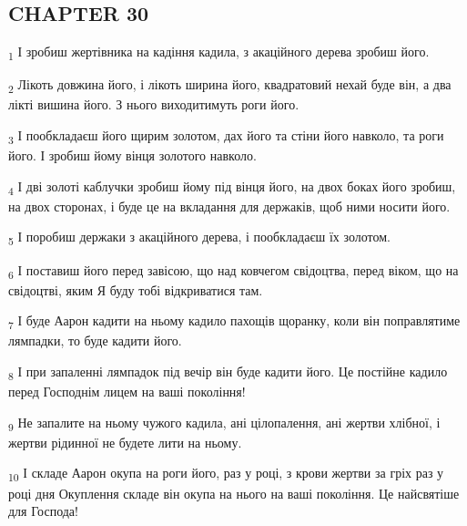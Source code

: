 \subsection{CHAPTER 30}
\begin{tcolorbox}
\textsubscript{1} І зробиш жертівника на кадіння кадила, з акаційного дерева зробиш його.
\end{tcolorbox}
\begin{tcolorbox}
\textsubscript{2} Лікоть довжина його, і лікоть ширина його, квадратовий нехай буде він, а два лікті вишина його. З нього виходитимуть роги його.
\end{tcolorbox}
\begin{tcolorbox}
\textsubscript{3} І пообкладаєш його щирим золотом, дах його та стіни його навколо, та роги його. І зробиш йому вінця золотого навколо.
\end{tcolorbox}
\begin{tcolorbox}
\textsubscript{4} І дві золоті каблучки зробиш йому під вінця його, на двох боках його зробиш, на двох сторонах, і буде це на вкладання для держаків, щоб ними носити його.
\end{tcolorbox}
\begin{tcolorbox}
\textsubscript{5} І поробиш держаки з акаційного дерева, і пообкладаєш їх золотом.
\end{tcolorbox}
\begin{tcolorbox}
\textsubscript{6} І поставиш його перед завісою, що над ковчегом свідоцтва, перед віком, що на свідоцтві, яким Я буду тобі відкриватися там.
\end{tcolorbox}
\begin{tcolorbox}
\textsubscript{7} І буде Аарон кадити на ньому кадило пахощів щоранку, коли він поправлятиме лямпадки, то буде кадити його.
\end{tcolorbox}
\begin{tcolorbox}
\textsubscript{8} І при запаленні лямпадок під вечір він буде кадити його. Це постійне кадило перед Господнім лицем на ваші покоління!
\end{tcolorbox}
\begin{tcolorbox}
\textsubscript{9} Не запалите на ньому чужого кадила, ані цілопалення, ані жертви хлібної, і жертви рідинної не будете лити на ньому.
\end{tcolorbox}
\begin{tcolorbox}
\textsubscript{10} І складе Аарон окупа на роги його, раз у році, з крови жертви за гріх раз у році дня Окуплення складе він окупа на нього на ваші покоління. Це найсвятіше для Господа!
\end{tcolorbox}
